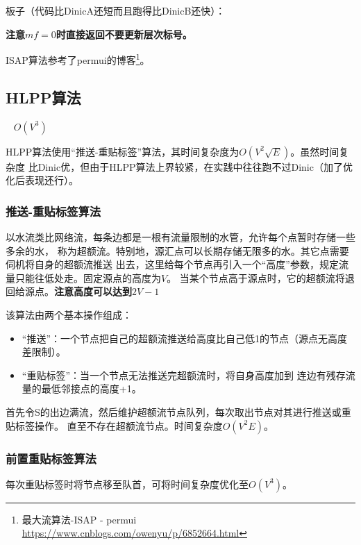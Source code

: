 板子（代码比DinicA还短而且跑得比DinicB还快）：


{\bfseries 注意$mf=0$时直接返回不要更新层次标号。}

ISAP算法参考了permui的博客\footnote{ 最大流算法-ISAP - permui
\url{https://www.cnblogs.com/owenyu/p/6852664.html}}。

\subsection{HLPP算法}

\cite{ITA3}~
$O(V^3)$

HLPP算法使用``推送-重贴标签''算法，其时间复杂度为$O(V^2\sqrt{E})$。虽然时间复杂度
比Dinic优，但由于HLPP算法上界较紧，在实践中往往跑不过Dinic（加了优化后表现还行）。

\subsubsection{推送-重贴标签算法}

以水流类比网络流，每条边都是一根有流量限制的水管，允许每个点暂时存储一些多余的水，
称为超额流。特别地，源汇点可以长期存储无限多的水。其它点需要伺机将自身的超额流推送
出去，这里给每个节点再引入一个``高度''参数，规定流量只能往低处走。固定源点的高度为$V$。
当某个节点高于源点时，它的超额流将退回给源点。{\bfseries 注意高度可以达到$2V-1$}

该算法由两个基本操作组成：
\begin{itemize}
	\item ``推送''：一个节点把自己的超额流推送给高度比自己低1的节点（源点无高度差限制）。
	\item ``重贴标签''：当一个节点无法推送完超额流时，将自身高度加到
	连边有残存流量的最低邻接点的高度+1。
\end{itemize}

首先令S的出边满流，然后维护超额流节点队列，每次取出节点对其进行推送或重贴标签操作。
直至不存在超额流节点。时间复杂度$O(V^2E)$。

\subsubsection{前置重贴标签算法}

每次重贴标签时将节点移至队首，可将时间复杂度优化至$O(V^3)$。

